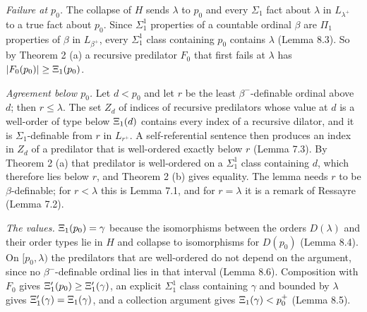 \documentclass[11pt]{article}
\begin{document}
\emph{Failure at $p_0$.} The collapse of $H$ sends $\lambda$ to $p_0$ and every $\Sigma_1$ fact about $\lambda$ in
$L_{\lambda^+}$ to a true fact about $p_0$. Since $\Sigma^1_1$ properties of a countable ordinal $\beta$ are $\Pi_1$
properties of $\beta$ in $L_{\beta^+}$, every $\Sigma^1_1$ class containing $p_0$ contains $\lambda$ (Lemma 8.3). So
by Theorem 2 (a) a recursive predilator $F_0$ that first fails at $\lambda$ has $|F_0(p_0)| \ge \Xi_1(p_0)$.

\emph{Agreement below $p_0$.} Let $d < p_0$ and let $r$ be the least $\beta^-$-definable ordinal above $d$; then
$r \le \lambda$. The set $Z_d$ of indices of recursive predilators whose value at $d$ is a well-order of type below
$\Xi_1(d)$ contains every index of a recursive dilator, and it is $\Sigma_1$-definable from $r$ in $L_{r^+}$. A
self-referential sentence then produces an index in $Z_d$ of a predilator that is well-ordered exactly below $r$
(Lemma 7.3). By Theorem 2 (a) that predilator is well-ordered on a $\Sigma^1_1$ class containing $d$, which
therefore lies below $r$, and Theorem 2 (b) gives equality. The lemma needs $r$ to be $\beta$-definable; for
$r < \lambda$ this is Lemma 7.1, and for $r = \lambda$ it is a remark of Ressayre (Lemma 7.2).

\emph{The values.} $\Xi_1(p_0) = \gamma$ because the isomorphisms between the orders $D(\lambda)$ and their order types
lie in $H$ and collapse to isomorphisms for $D(p_0)$ (Lemma 8.4). On $[p_0, \lambda)$ the predilators that are
well-ordered do not depend on the argument, since no $\beta^-$-definable ordinal lies in that interval (Lemma 8.6).
Composition with $F_0$ gives $\Xi'_1(p_0) \ge \Xi'_1(\gamma)$, an explicit $\Sigma^1_1$ class containing $\gamma$ and
bounded by $\lambda$ gives $\Xi'_1(\gamma) = \Xi_1(\gamma)$, and a collection argument gives $\Xi_1(\gamma) < p_0^+$
(Lemma 8.5).
\end{document}
